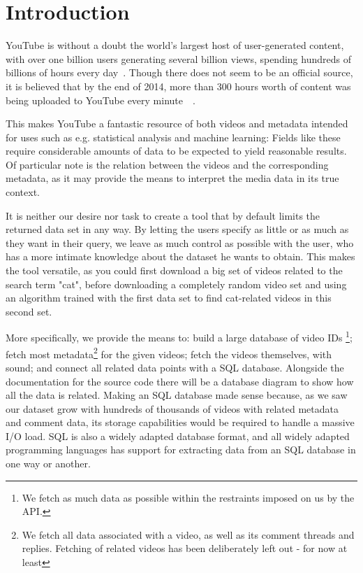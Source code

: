 
\section{Introduction}

YouTube is without a doubt the world's largest host of user-generated content,
with over one billion users generating several billion views, spending hundreds
of billions of hours every day~\cite{officialstats}. Though there does not seem
to be an official source, it is believed that by the end of 2014, more than 300
hours worth of content was being uploaded to YouTube every
minute~\cite{dagensmediastats}~\cite{reelseostats}. 

This makes YouTube a fantastic resource of both videos and metadata intended for
uses such as e.g. statistical analysis and machine learning: Fields like these
require considerable amounts of data to be expected to yield reasonable results.
Of particular note is the relation between the videos and the corresponding 
metadata, as it may provide the means to interpret the media data in its true
context.

It is neither our desire nor task to create a tool that by default limits the
returned data set in any way. By letting the users specify as little or as much
as they want in their query, we leave as much control as possible with the user,
who has a more intimate knowledge about the dataset he wants to obtain.
This makes the tool versatile, as you could first
download a big set of videos related to the search term "cat", before
downloading a completely random video set and using an algorithm trained with
the first data set to find cat-related videos in this second set. 

More specifically, we provide the means to: build a large database of video IDs
\footnote{We fetch as much data as possible within the restraints imposed
on us by the API.}; fetch most metadata\footnote{We fetch all data associated
with a video, as well as its comment threads and replies. Fetching of related
videos has been deliberately left out - for now at least} for the given videos;
fetch the videos themselves, with sound; and connect all related data points
with a SQL database. Alongside the documentation for the source code there will
be a database diagram to show how all the data is related. Making an SQL database
made sense because, as we saw our dataset grow with hundreds of thousands of
videos with related metadata and comment data, its storage capabilities
would be required
to handle a massive I/O load. SQL is also a widely adapted database
format, and all widely adapted programming languages has support for
extracting data from an SQL database in one way or another.

